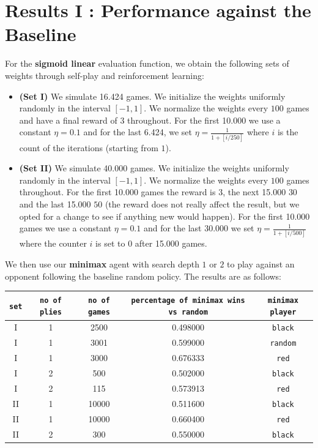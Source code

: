 \documentclass[11pt, a4paper, twoside]{amsart} %
\theoremstyle{definition}
\begin{document}
\section{Results I : Performance against the Baseline}

For the \textbf{sigmoid linear} evaluation function, we obtain the following sets of weights through self-play and reinforcement learning:
\begin{itemize}
\item \textbf{(Set I)} We simulate 16.424 games. We initialize the weights uniformly randomly in the interval $[-1, 1]$. We normalize the weights every $100$ games and have a final reward of $3$ throughout. For the first 10.000 we use a constant $\eta = 0.1$ and for the last 6.424, we set $\eta = \frac{1}{1 + [i/250]}$ where $i$ is the count of the iterations (starting from $1$).
\item \textbf{(Set II)} We simulate 40.000 games. We initialize the weights uniformly randomly in the interval $[-1, 1]$. We normalize the weights every $100$ games throughout. For the first 10.000 games the reward is $3$, the next 15.000 $30$ and the last 15.000 $50$ (the reward does not really affect the result, but we opted for a change to see if anything new would happen). For the first 10.000 games we use a constant $\eta = 0.1$ and for the last 30.000 we set $\eta = \frac{1}{1 + [i/500]}$ where the counter $i$ is set to $0$ after 15.000 games.
\end{itemize}
We then use our \textbf{minimax} agent with search depth $1$ or $2$ to play against an opponent following the baseline random policy. The results are as follows:
\begin{center}
\begin{tabular}{ | c | c | c | c | c | }
\hline
\texttt{set} & \texttt{no of plies} & \texttt{no of games} & \texttt{percentage of minimax wins vs random} & \texttt{minimax player}\\ \hline
I & 1 & 2500 & 0.498000 & \texttt{black}\\ \hline
I & 1 & 3001 & 0.599000 & \texttt{random}\\ \hline
I & 1 & 3000 & 0.676333 & \texttt{red}\\ \hline
I & 2 & 500 & 0.502000 & \texttt{black}\\ \hline
I & 2 & 115 & 0.573913 & \texttt{red}\\ \hline
II & 1 & 10000 & 0.511600 & \texttt{black}\\ \hline
II & 1 & 10000 & 0.660400 & \texttt{red}\\ \hline
II & 2 & 300 & 0.550000 & \texttt{black}\\ \hline
\end{tabular}
\end{center}
\end{document}
